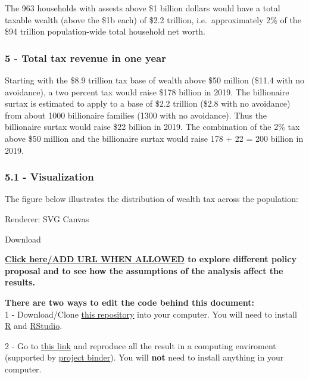 \documentclass[]{article}
\begin{document}
The 963 households with assests above \$1 billion dollars would have a
total taxable wealth (above the \$1b each) of \$2.2 trillion,
i.e.~approximately 2\% of the \$94 trillion population-wide total
household net worth.

\hypertarget{total-tax-revenue-in-one-year}{%
\subsubsection{5 - Total tax revenue in one
year}\label{total-tax-revenue-in-one-year}}

Starting with the \$8.9 trillion tax base of wealth above \$50 million
(\$11.4 with no avoidance), a two percent tax would raise \$178 billion
in 2019. The billionaire surtax is estimated to apply to a base of \$2.2
trillion (\$2.8 with no avoidance) from about 1000 billionaire families
(1300 with no avoidance). Thus the billionaire surtax would raise \$22
billion in 2019. The combination of the 2\% tax above \$50 million and
the billionaire surtax would raise 178 + 22 = 200 billion in 2019.

\hypertarget{visualization}{%
\subsubsection{5.1 - Visualization}\label{visualization}}

The figure below illustrates the distribution of wealth tax across the
population:

\hypertarget{plot_id527262729-container}{}
\hypertarget{plot_id527262729}{}

Renderer: SVG \textbar{} Canvas

Download

\textbf{\href{NULL}{Click here/ADD URL WHEN ALLOWED} to explore
different policy proposal and to see how the assumptions of the analysis
affect the results.}

\textbf{There are two ways to edit the code behind this document:}\\
1 - Download/Clone \href{https://github.com/fhoces/opa-wealthtax}{this
repository} into your computer. You will need to install
\href{https://cloud.r-project.org/}{R} and
\href{https://www.rstudio.com/products/rstudio/download/\#download}{RStudio}.

2 - Go to
\href{https://mybinder.org/v2/gh/fhoces/opa-wealthtax/master?urlpath=rstudio}{this
link} and reproduce all the result in a computing enviroment (supported
by \href{https://mybinder.org/}{project binder}). You will \textbf{not}
need to install anything in your computer.
\end{document}
